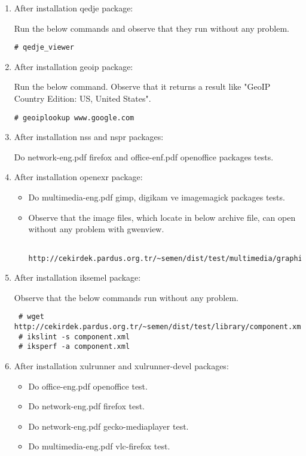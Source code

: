 \documentclass[a4paper,10pt]{article}
\begin{document}
\begin{enumerate}
\item After installation qedje package:

Run the below commands and observe that they run without any problem.
\begin{verbatim}
# qedje_viewer
\end{verbatim}

\item After installation geoip package:

Run the below command. Observe that it returns a result like "GeoIP Country Edition: US, United States".
\begin{verbatim}
# geoiplookup www.google.com 
\end{verbatim}

\item After installation nss and nspr packages:

Do network-eng.pdf firefox and office-enf.pdf openoffice packages tests.

\item After installation openexr package:
\begin{itemize}
 \item Do multimedia-eng.pdf gimp, digikam ve imagemagick packages tests.
 \item Observe that the image files, which locate in below archive file, can open without any problem with gwenview.
  \begin{verbatim}
   http://cekirdek.pardus.org.tr/~semen/dist/test/multimedia/graphics/graphics.tar
  \end{verbatim}
\end{itemize}
\item After installation iksemel package:

Observe that the below commands run without any problem.
\begin{verbatim}
 # wget http://cekirdek.pardus.org.tr/~semen/dist/test/library/component.xml
 # ikslint -s component.xml
 # iksperf -a component.xml 
\end{verbatim}

\item After installation xulrunner and xulrunner-devel packages:
\begin{itemize}
\item Do office-eng.pdf openoffice test.
\item Do network-eng.pdf firefox test.
\item Do network-eng.pdf gecko-mediaplayer test.
\item Do multimedia-eng.pdf vlc-firefox test.
\end{itemize}


\end{enumerate}
\end{document}
